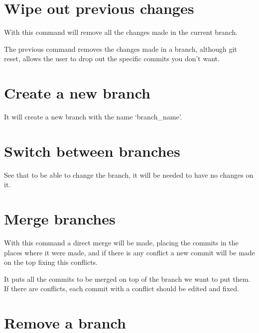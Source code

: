 \section*{Wipe out previous changes}

\noindent{}

With this command will remove all the changes made in the current branch.

\noindent{}

The previous command removes the changes made in a branch, although git reset, allows the user to drop out the specific commits you don't want.

\section*{Create a new branch}

\noindent{}

It will create a new branch with the name `branch\_name'.

\section*{Switch between branches}

\noindent{}

See that to be able to change the branch, it will be needed to have no changes on it.

\newpage
\section*{Merge branches}

\noindent{}

With this command a direct merge will be made, placing the commits in the places where it were made, and if there is any conflict a new commit will be made on the top fixing this conflicts.

\noindent{}

It puts all the commits to be merged on top of the branch we want to put them. If there are conflicts, each commit with a conflict should be edited and fixed.

\section*{Remove a branch}

